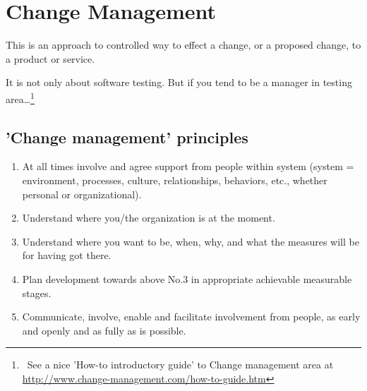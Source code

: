 \section{Change Management}
\label{sec:Change Management}

This is an approach to controlled way to effect a change, or a proposed change, to a product or service.

It is not only about software testing. But if you tend to be a manager in testing area\ldots\footnote{~See a nice 'How-to introductory guide' to Change management area at \url{http://www.change-management.com/how-to-guide.htm}}

\subsection{'Change management' principles}
\label{sec:'Change management' principles}

\begin{enumerate}
\item 
At all times involve and agree support from people within system (system = environment, processes, culture, relationships, behaviors, etc., whether personal or organizational).
\item 
        Understand where you/the organization is at the moment.
\item 
        Understand where you want to be, when, why, and what the measures will be for having got there.
\item 
        Plan development towards above No.3 in appropriate achievable measurable stages.
\item 
        Communicate, involve, enable and facilitate involvement from people, as early and openly and as fully as is possible.
\end{enumerate}
